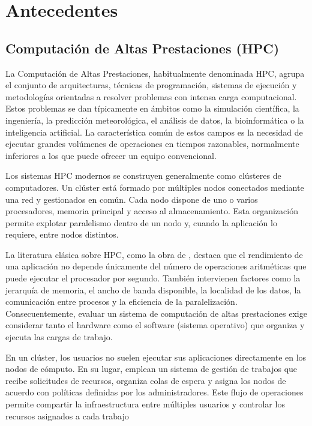 \chapter{Antecedentes}
\label{chap:antecedentes}

\section{Computación de Altas Prestaciones (HPC)}

La Computación de Altas Prestaciones, habitualmente denominada HPC, agrupa el conjunto de arquitecturas, técnicas de programación, sistemas de ejecución y metodologías orientadas a resolver problemas con intensa carga computacional. Estos problemas se dan típicamente en ámbitos como la simulación científica, la ingeniería, la predicción meteorológica, el análisis de datos, la bioinformática o la inteligencia artificial. La característica común de estos campos es la necesidad de ejecutar grandes volúmenes de operaciones en tiempos razonables, normalmente inferiores a los que puede ofrecer un equipo convencional.

Los sistemas HPC modernos se construyen generalmente como clústeres de computadores. Un clúster está formado por múltiples nodos conectados mediante una red y gestionados en común. Cada nodo dispone de uno o varios procesadores, memoria principal y acceso al almacenamiento. Esta organización permite explotar paralelismo dentro de un nodo y, cuando la aplicación lo requiere, entre nodos distintos.

La literatura clásica sobre HPC, como la obra de \textcite{hager2011}, destaca que el rendimiento de una aplicación no depende únicamente del número de operaciones aritméticas que puede ejecutar el procesador por segundo. También intervienen factores como la jerarquía de memoria, el ancho de banda disponible, la localidad de los datos, la comunicación entre procesos y la eficiencia de la paralelización. Consecuentemente, evaluar un sistema de computación de altas prestaciones exige considerar tanto el hardware como el software (sistema operativo) que organiza y ejecuta las cargas de trabajo.

En un clúster, los usuarios no suelen ejecutar sus aplicaciones directamente en los nodos de cómputo. En su lugar, emplean un sistema de gestión de trabajos que recibe solicitudes de recursos, organiza colas de espera y asigna los nodos de acuerdo con políticas definidas por los administradores. Este flujo de operaciones permite compartir la infraestructura entre múltiples usuarios y controlar los recursos asignados a cada trabajo \parencite{hager2011}

